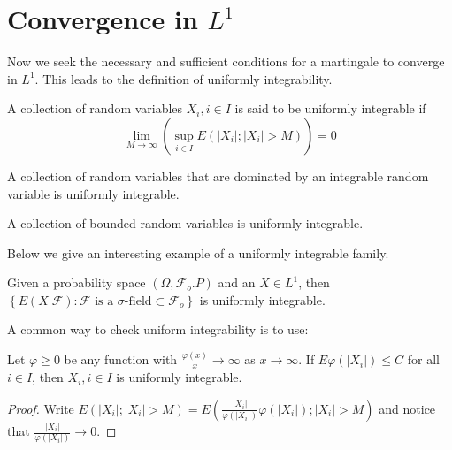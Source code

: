 \section{\texorpdfstring{Convergence in $L^1$}{Convergence in L1}}
Now we seek the necessary and sufficient conditions for a martingale to converge in $L^1$. This leads to the definition of uniformly integrability.
\begin{definition}
A collection of random variables $X_i,i\in I$ is said to be uniformly integrable if 
\[\lim_{M\to\infty}(\sup_{i\in I}E(\left|X_i\right|;\left|X_i\right|>M))=0\]
\end{definition}
\begin{example}
    A collection of random variables that are dominated by an integrable random variable is uniformly integrable.
\end{example}
\begin{example}
    A collection of bounded random variables is uniformly integrable.
\end{example}
Below we give an interesting example of a uniformly integrable family.
\begin{theorem}
Given a probability space $(\Omega,\mathcal{F}_o.P)$ and an $X\in L^1$, then $\left\{E(X|\mathcal{F}):\mathcal{F}\text{ is a }\sigma\text{-field}\subset\mathcal{F}_o\right\}$ is uniformly integrable.
\end{theorem}

A common way to check uniform integrability is to use:
\begin{lemma}
Let $\varphi\geq 0$ be any function with $\frac{\varphi(x)}{x}\to\infty$ as $x\to\infty$. If $E\varphi(\left|X_i\right|)\le C$ for all $i\in I$, then $X_i,i\in I$ is uniformly integrable.
\end{lemma}
\begin{proof}
    Write $E(\left|X_i\right|;\left|X_i\right|>M)=E(\frac{\left|X_i\right|}{\varphi(\left|X_i\right|)}\varphi(\left|X_i\right|);\left|X_i\right|>M)$ and notice that $\frac{\left|X_i\right|}{\varphi(\left|X_i\right|)}\to 0$.
\end{proof}



